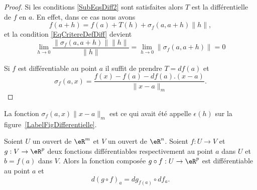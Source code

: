 \begin{proof}
	Si les conditions \eqref{SubEqsDiff2} sont satisfaites alors $T$ est la différentielle de $f$ en $a$. En effet, dans ce cas nous avons
	\begin{equation}
		f(a+h)=f(a)+T(h)+\sigma_f(a,a+h)\| h \|,
	\end{equation}
	et la condition \eqref{EqCritereDefDiff} devient
	\begin{equation}
		\lim_{h\to 0} \frac{ \| \sigma_f(a,a+h) \|\| h \| }{ \| h \| }=\lim_{h\to 0} \| \sigma_f(a,a+h)\| =0
	\end{equation}


	Si $f$ est différentiable au point $a$ il suffit de prendre $T=df(a)$ et
	\[
		\sigma_f(a,x)=\frac{f(x)-f(a)-df(a).(x-a)}{\|x-a\|_m}.
	\]
\end{proof}

\begin{remark}
	La fonction $\sigma_f(a,x)\| x-a \|_m$ est ce qui avait été appelle $\epsilon(h)$ sur la figure~\ref{LabelFigDifferentielle}.
\end{remark}

\begin{proposition}		\label{PropDiffCompose}
	Soient $U$ un ouvert de $\eR^m$ et $V$ un ouvert de $\eR^n$. Soient $f: U\to V$  et $g: V \to \eR^p$ deux fonctions différentiables respectivement au point $a$ dans $U$ et $b=f(a)$ dans $V$. Alors la fonction composée $g\circ f: U\to \eR^p $ est différentiable au point $a$ et
	\begin{equation}	\label{EqDiffCompose}
		d(g\circ f)_a=dg_{f(a)}\circ df_a.
	\end{equation}
\end{proposition}

